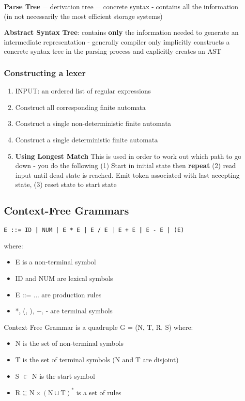 \documentclass{article}
\newenvironment{definition}{\par\color{blue}}{\par}
\begin{document}
\begin{definition}
	\noindent
	\textbf{Parse Tree} = derivation tree = concrete syntax - contains all the information (in not necessarily the most efficient storage systems)
	
	\noindent
	\textbf{Abstract Syntax Tree}: contains \textbf{only} the information needed to generate an intermediate representation - generally compiler only implicitly constructs a concrete syntax tree in the parsing process and explicitly creates an AST
\end{definition}

\subsubsection{Constructing a lexer}
\begin{enumerate}
	\item INPUT: an ordered list of regular expressions
	\item Construct all corresponding finite automata
	\item Construct a single non-deterministic finite automata
	\item Construct a single deterministic finite automata
	\item \textbf{Using Longest Match}
	\subitem This is used in order to work out which path to go down - you do the following (1) Start in initial state then \textbf{repeat} (2) read input until dead state is reached. Emit token associated with last accepting state, (3) reset state to start state
\end{enumerate}

\subsection{Context-Free Grammars}
\begin{lstlisting}
E ::= ID | NUM | E * E | E / E | E + E | E - E | (E)
\end{lstlisting}
where:

\begin{itemize}
	\item E is a non-terminal symbol
	\item ID and NUM are lexical symbols
	\item E ::= ... are production rules
	\item *, (, ), +, - are terminal symbols
\end{itemize}


\begin{definition}
	\noindent
	Context Free Grammar is a quadruple G = (N, T, R, S) where:
	\begin{itemize}
		\item N is the set of non-terminal symbols
		\item T is the set of terminal symbols (N and T are disjoint)
		\item S $\in$ N is the start symbol
		\item $\mathrm{R} \subseteq \mathrm{N} \times(\mathrm{N} \cup \mathrm{T})^{*}$ is a set of rules
	\end{itemize}
\end{definition}
\end{document}
